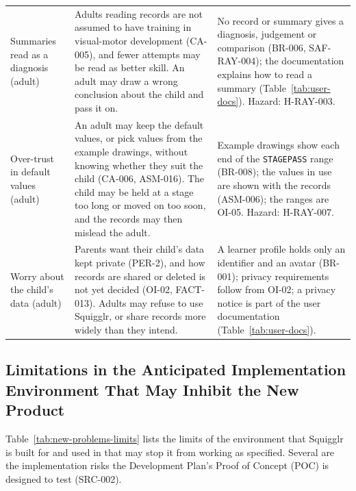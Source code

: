 \documentclass[12pt]{article}
\renewcommand{\_}{\textunderscore\allowbreak}%
\begin{document}
{\begin{longtable}{@{}>{\raggedright\arraybackslash}p{}%
>{\raggedright\arraybackslash}p{}%
>{\raggedright\arraybackslash}p{}@{}}
\addlinespace
Summaries read as a diagnosis (adult) & Adults reading records are not assumed
to have training in visual-motor development (CA-005), and fewer attempts may be
read as better skill. An adult may draw a wrong conclusion about the child and
pass it on. & No record or summary gives a diagnosis, judgement or comparison
(BR-006, SAF-RAY-004); the documentation explains how to read a summary
(Table~\ref{tab:user-docs}). Hazard: H-RAY-003. \\
\addlinespace
Over-trust in default values (adult) & An adult may keep the default values, or
pick values from the example drawings, without knowing whether they suit the
child (CA-006, ASM-016). The child may be held at a stage too long or moved on
too soon, and the records may then mislead the adult. & Example drawings show
each end of the \texttt{STAGE\_PASS} range (BR-008); the values in use are shown
with the records (ASM-006); the ranges are OI-05. Hazard: H-RAY-007. \\
\addlinespace
Worry about the child's data (adult) & Parents want their child's data kept
private (PER-2), and how records are shared or deleted is not yet decided
(OI-02, FACT-013). Adults may refuse to use Squigglr, or share records more
widely than they intend. & A learner profile holds only an identifier and an
avatar (BR-001); privacy requirements follow from OI-02; a
privacy notice is part of the user documentation (Table~\ref{tab:user-docs}). \\
\end{longtable}
}

\subsection{Limitations in the Anticipated Implementation Environment That May
Inhibit the New Product} Table~\ref{tab:new-problems-limits} lists the limits of
the environment that Squigglr is built for and used in that may stop it from
working as specified. Several are the implementation risks the Development
Plan's Proof of Concept (POC) is designed to test (SRC-002).
\end{document}
